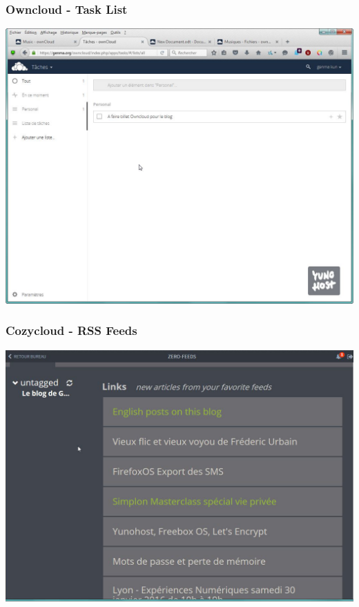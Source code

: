 \documentclass{beamer}
\begin{document}
\begin{frame}
\frametitle{Owncloud - Task List}
\includegraphics[scale=0.35] {./Owncloud/Owncloud_Taches.jpg}
\end{frame}

\begin{frame}
\frametitle{Cozycloud - RSS Feeds}
\includegraphics[scale=0.3] {./CozyCloud/CozyCloud_Zero-feeds.jpg}
\end{frame}
\end{document}

